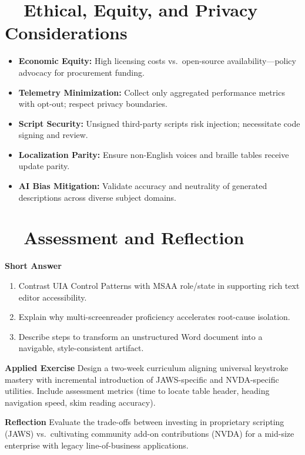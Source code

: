 \section{~~Ethical, Equity, and Privacy Considerations}
\label{sec:sr25-ethics}
\begin{itemize}
	\item \textbf{Economic Equity:} High licensing costs vs.\ open-source availability—policy advocacy for procurement funding.
	\item \textbf{Telemetry Minimization:} Collect only aggregated performance metrics with opt-out; respect privacy boundaries.
	\item \textbf{Script Security:} Unsigned third-party scripts risk injection; necessitate code signing and review.
	\item \textbf{Localization Parity:} Ensure non-English voices and braille tables receive update parity.
	\item \textbf{AI Bias Mitigation:} Validate accuracy and neutrality of generated descriptions across diverse subject domains.
\end{itemize}

\section{~~Assessment and Reflection}
\label{sec:sr25-assessment}
\textbf{Short Answer}
\begin{enumerate}
	\item Contrast UIA Control Patterns with MSAA role/state in supporting rich text editor accessibility.
	\item Explain why multi-screenreader proficiency accelerates root-cause isolation.
	\item Describe steps to transform an unstructured Word document into a navigable, style-consistent artifact.
\end{enumerate}

\textbf{Applied Exercise} Design a two-week curriculum aligning universal keystroke mastery with incremental introduction of JAWS-specific and NVDA-specific utilities. Include assessment metrics (time to locate table header, heading navigation speed, skim reading accuracy).

\textbf{Reflection} Evaluate the trade-offs between investing in proprietary scripting (JAWS) vs.\ cultivating community add-on contributions (NVDA) for a mid-size enterprise with legacy line-of-business applications.

